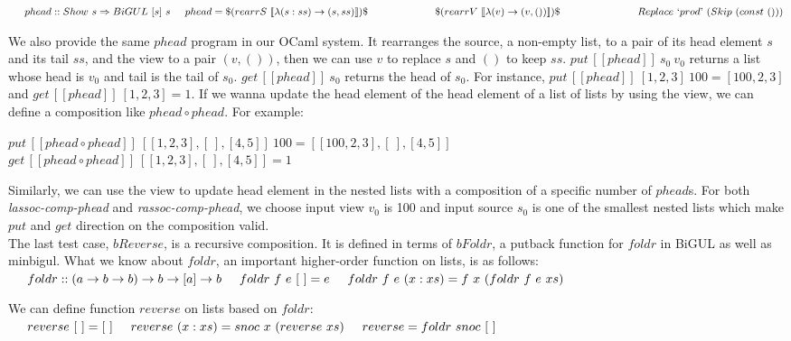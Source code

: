 \documentclass[runningheads]{llncs}
\newcommand{\tab}{\hspace*{5mm}}
\newcommand{\qtab}{\hspace*{5mm} \ \quad}
\newcommand{\putbx}[3]{put \, [\![#1]\!] \ #2 \ #3}
\newcommand{\getbx}[2]{get \, [\![#1]\!] \ #2}
\begin{document}
    $\tab phead :: Show \ s \Rightarrow BiGUL \ [s] \ s\\
    \tab phead = \$(rearrS \ [\![\lambda(s:ss) \to (s,ss)]\!])\$\\
        \qtab \qtab \quad \$(rearrV \ [\![\lambda(v) \to (v,())]\!])\$\\
            \qtab \qtab \qquad Replace \ `prod\text{'} \ (Skip \ (const \ ()))$

We also provide the same $phead$ program in our OCaml system. It rearranges the source, a non-empty list, to a pair of its head element $s$ and its tail $ss$, and the view to a pair $(v, ())$, then we can use $v$ to replace $s$ and $()$ to keep $ss$. $\putbx{phead}{s_0}{v_0}$ returns a list whose head is $v_0$ and tail is the tail of $s_0$. $\getbx{phead}{s_0}$ returns the head of $s_0$. For instance, $\putbx{phead}{[1,2,3]}{100} = [100,2,3]$ and $\getbx{phead}{[1,2,3]} = 1$. If we wanna update the head element of the head element of a list of lists by using the view, we can define a composition like $phead \circ phead$. For example:

    \tab $\putbx{phead \circ phead}{[[1,2,3],[\ ],[4,5]]}{100} = [[100,2,3],[\ ],[4,5]]$\\
    \tab $\getbx{phead \circ phead}{[[1,2,3],[\ ],[4,5]]} = 1$

Similarly, we can use the view to update head element in the nested lists with a composition of a specific number of $phead$s. For both \textit{lassoc-comp-phead} and \textit{rassoc-comp-phead}, we choose input view $v_0$ is 100 and input source $s_0$ is one of the smallest nested lists which make $put$ and $get$ direction on the composition valid.\\

The last test case, $bReverse$, is a recursive composition. It is defined in terms of $bFoldr$, a putback function for $foldr$ in BiGUL as well as minbigul. What we know about $foldr$, an important higher-order function on lists, is as follows:\\
    $\tab foldr :: (a \to b \to b) \to b \to [a] \to b\\
    \tab foldr \ f \ e \ [\ ] = e\\
    \tab foldr \ f \ e \ (x:xs) = f \ x \ (foldr \ f \ e \ xs)$

We can define function $reverse$ on lists based on $foldr$:\\
    $\tab reverse \ [\ ] = [\ ]\\
    \tab reverse \ (x:xs) = snoc \ x \ (reverse \ xs)\\
    \tab reverse = foldr \ snoc \ [\ ]$
\end{document}
